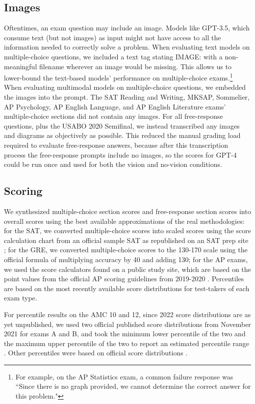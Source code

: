 \documentclass{article}
\begin{document}
\subsection{Images}
Oftentimes, an exam question may include an image. Models like GPT-3.5, which consume text (but not images) as input might not have access to all the information needed to correctly solve a problem. When evaluating text models on multiple-choice questions, we included a text tag stating IMAGE: with a non-meaningful filename wherever an image would be missing. This allows us to lower-bound the text-based models' performance on multiple-choice exams.\footnote{For example, on the AP Statistics exam, a common failure response was ``Since there is no graph provided, we cannot determine the correct answer for this problem."} When evaluating multimodal models on multiple-choice questions, we embedded the images into the prompt. The SAT Reading and Writing, MKSAP, Sommelier, AP Psychology, AP English Language, and AP English Literature exams' multiple-choice sections did not contain any images. For all free-response questions, plus the USABO 2020 Semifinal, we instead transcribed any images and diagrams as objectively as possible. This reduced the manual grading load required to evaluate free-response answers, because after this transcription process the free-response prompts include no images, so the scores for GPT-4 could be run once and used for both the vision and no-vision conditions.

\subsection{Scoring}\label{appendix:exam_scoring}
We synthesized multiple-choice section scores and free-response section scores into overall scores using the best available approximations of the real methodologies: for the SAT, we converted multiple-choice scores into scaled scores using the score calculation chart from an official sample SAT as republished on an SAT prep site \cite{seigel2020calculate}; for the GRE, we converted multiple-choice scores to the 130-170 scale using the official formula of multiplying accuracy by 40 and adding 130; for the AP exams, we used the score calculators found on a public study site, which are based on the point values from the official AP scoring guidelines from 2019-2020 \cite{albertio_blog}. Percentiles are based on the most recently available score distributions for test-takers of each exam type.

For percentile results on the AMC 10 and 12, since 2022 score distributions are as yet unpublished, we used two official published score distributions from November 2021 for exams A and B, and took the minimum lower percentile of the two and the maximum upper percentile of the two to report an estimated percentile range \cite{amc_statistics}. Other percentiles were based on official score distributions \cite{sat_percentiles_and_score_rankings} \cite{understanding_sat_scores} \cite{ap_score_distributions_by_subject_2022} \cite{usabo_semifinal_exam_histogram_2020} \cite{magoosh_gre_score_percentiles}.
\end{document}
